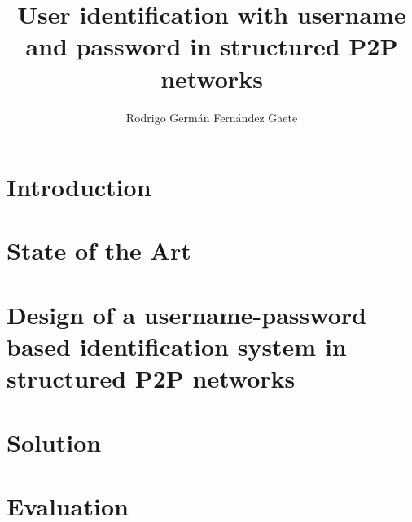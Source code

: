 \documentclass[letter, 12pt]{report}
\title{User identification with username and password in structured P2P networks}
\author{Rodrigo Germán Fernández Gaete}
\begin{document}


\beforepreface





\newpage


\newpage

\afterpreface


\renewcommand{\chaptername}{Chapter}
\setcounter{secnumdepth}{3}
\setcounter{tocdepth}{3}

\chapter{Introduction}
\label{sec:intro}



\chapter{State of the Art}
\label{sec:soa_p2p}


\label{sec:soa_p2p_user_identification}


\label{sec:soa_p2p_trust}


\chapter{Design of a username-password based identification system in structured P2P networks}
\label{sec:formalization}

\chapter{Solution}
\label{sec:system}


\chapter{Evaluation}
\label{sec:evaluation}

\end{document}

